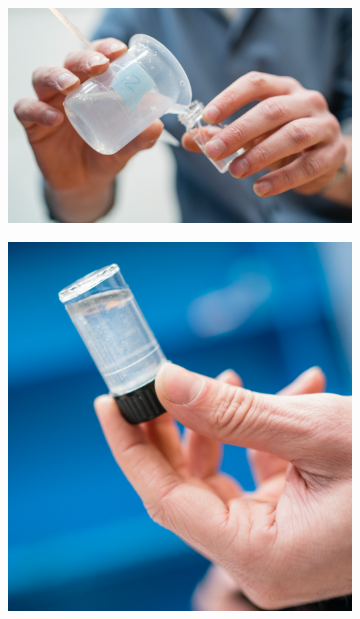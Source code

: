 \begin{figure}[ht!]
\begin{subfigure}{.149\textwidth}
\end{subfigure}
\begin{subfigure}{.282\textwidth}
  \centering
  \includegraphics[width=.9\linewidth]{Images/Sample_3.png}
\end{subfigure}
\begin{subfigure}{.164\textwidth}
  \centering
  \includegraphics[width=.9\linewidth]{Images/Sample_4.png}
\end{subfigure}
\begin{subfigure}{.202\textwidth}
  \centering

\end{subfigure}
\end{figure}
